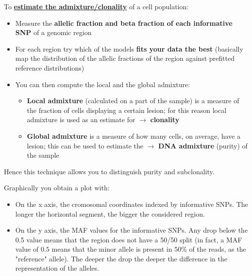   To \underline{\textbf{estimate the admixture/clonality}} of a cell population:
  \begin{itemize}
    \item Measure the \textbf{allelic fraction and beta fraction of each
    informative SNP} of a genomic region
    \item For each region try which of the models \textbf{fits your data the
    best} (basically map the distribution of the allelic fractions of the region
    against prefitted reference distributions) 

    \item You can then compute the local and the global admixture:
    \begin{itemize}
      \item \textbf{Local admixture} (calculated on a part of the sample) is a
      measure of the fraction of cells displaying a certain lesion; for this
      reason local admixture is used as an estimate for $\rightarrow$
      \textbf{clonality}
      \item \textbf{Global admixture} is a measure of how many cells, on
      average, have a lesion; this can be used to estimate the $\rightarrow$
      \textbf{DNA admixture} (purity) of the sample
    \end{itemize}
  \end{itemize}
  Hence this technique allows you to distinguish purity and subclonality.
  
  Graphically you obtain a plot with:
  \begin{itemize}
    \item On the x axis, the cromosomal coordinates indexed by informative SNPs.
    The longer the horizontal segment, the bigger the considered region. 
    \item On the y axis, the MAF values for the informative SNPs. Any drop below
    the 0.5 value means that the region does not have a 50/50 split (in fact, a
    MAF value of $0.5$ means that the minor allele is present in 50\% of the
    reads, as the "reference" allele). The deeper the drop the deeper the
    difference in the representation of the alleles. 
  \end{itemize}


